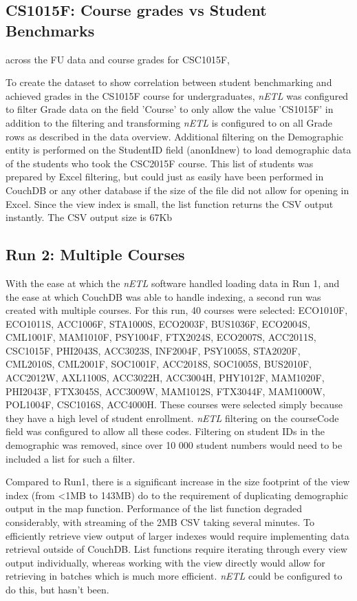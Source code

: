 \subsection{CS1015F: Course grades vs Student Benchmarks}


across the FU data and course grades for CSC1015F,


To create the dataset to show correlation between student benchmarking and achieved grades in the CS1015F course for undergraduates, \textit{nETL} was configured to filter Grade data on the field 'Course' to only allow the value 'CS1015F' in addition to the filtering and transforming \textit{nETL} is configured to on all Grade rows as described in the data overview. Additional filtering on the Demographic entity is performed on the StudentID field (anonIdnew) to load demographic data of the students who took the CSC2015F course. This list of students was prepared by Excel filtering, but could just as easily have been performed in CouchDB or any other database if the size of the file did not allow for opening in Excel. Since the view index is small, the list function returns the CSV output instantly. The CSV output size is 67Kb

\subsection{Run 2: Multiple Courses}
With the ease at which the \textit{nETL} software handled loading data in Run 1, and the ease at which CouchDB was able to handle indexing, a second run was created with multiple courses. For this run, 40 courses were selected: ECO1010F, ECO1011S, ACC1006F, STA1000S, ECO2003F, BUS1036F, ECO2004S, CML1001F, MAM1010F, PSY1004F, FTX2024S, ECO2007S, ACC2011S, CSC1015F, PHI2043S, ACC3023S, INF2004F, PSY1005S, STA2020F, CML2010S, CML2001F, SOC1001F, ACC2018S, SOC1005S, BUS2010F, ACC2012W, AXL1100S, ACC3022H, ACC3004H, PHY1012F, MAM1020F, PHI2043F, FTX3045S, ACC3009W, MAM1012S, FTX3044F, MAM1000W, POL1004F, CSC1016S, ACC4000H. These courses were selected simply because they have a high level of student enrollment. \textit{nETL} filtering on the courseCode field was configured to allow all these codes. Filtering on student IDs in the demographic was removed, since over 10 000 student numbers would need to be included a list for such a filter.

Compared to Run1, there is a significant increase in the size footprint of the view index (from \textless 1MB to 143MB) do to the requirement of duplicating demographic output in the map function. Performance of the list function degraded considerably, with streaming of the 2MB CSV taking several minutes. To efficiently retrieve view output of larger indexes would require implementing data retrieval outside of CouchDB. List functions require iterating through every view output individually, whereas working with the view directly would allow for retrieving in batches which is much more efficient. \textit{nETL} could be configured to do this, but hasn't been.

